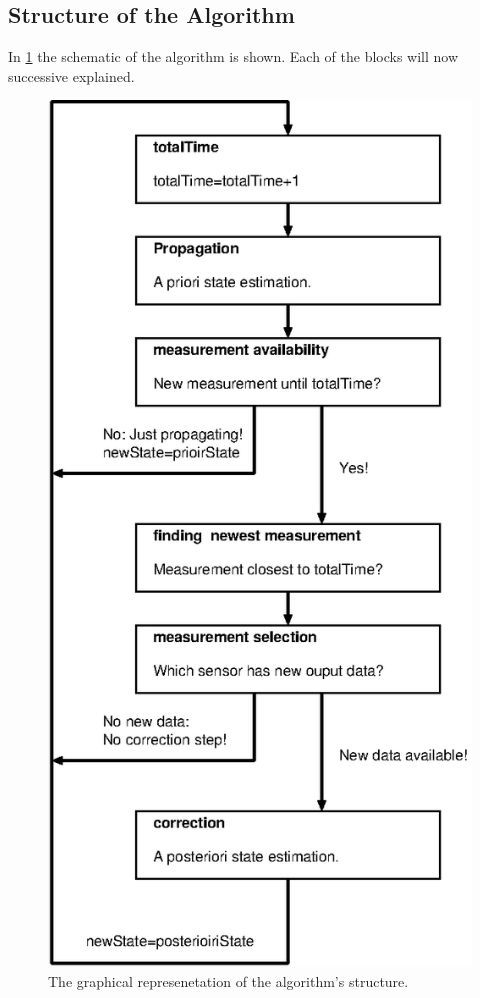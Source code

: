 \subsection*{Structure of the Algorithm}
In \ref{structure_algo} the schematic of the algorithm is shown. Each of the blocks will now successive explained.
\begin{figure}
\begin{center}
\includegraphics[width=8 cm]{pictures/structure_algo_1.eps}
\caption{The graphical represenetation of the algorithm's structure.}
\label{structure_algo}
\end{center}
\end{figure}


